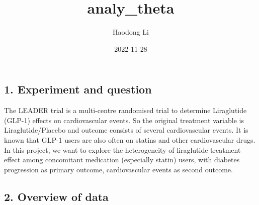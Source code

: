 \documentclass[
]{article}
\title{analy\_theta}
\author{Haodong Li}
\date{2022-11-28}
\newenvironment{Shaded}{\begin{snugshade}}{\end{snugshade}}
\newcommand{\AttributeTok}[1]{\textcolor[rgb]{0.77,0.63,0.00}{#1}}
\newcommand{\DecValTok}[1]{\textcolor[rgb]{0.00,0.00,0.81}{#1}}
\newcommand{\FunctionTok}[1]{\textcolor[rgb]{0.00,0.00,0.00}{#1}}
\newcommand{\NormalTok}[1]{#1}
\newcommand{\OtherTok}[1]{\textcolor[rgb]{0.56,0.35,0.01}{#1}}
\newcommand{\SpecialCharTok}[1]{\textcolor[rgb]{0.00,0.00,0.00}{#1}}
\newcommand{\StringTok}[1]{\textcolor[rgb]{0.31,0.60,0.02}{#1}}
\begin{document}
\maketitle

\hypertarget{experiment-and-question}{%
\subsection{1. Experiment and question}\label{experiment-and-question}}

The LEADER trial is a multi-centre randomised trial to determine
Liraglutide (GLP-1) effects on cardiovascular events. So the original
treatment variable is Liraglutide/Placebo and outcome consists of
several cardiovascular events. It is known that GLP-1 users are also
often on statins and other cardiovascular drugs. In this project, we
want to explore the heterogeneity of liraglutide treatment effect among
concomitant medication (especially statin) users, with diabetes
progression as primary outcome, cardiovascular events as second outcome.

\hypertarget{overview-of-data}{%
\subsection{2. Overview of data}\label{overview-of-data}}

\begin{Shaded}
\end{Shaded}
\end{document}
